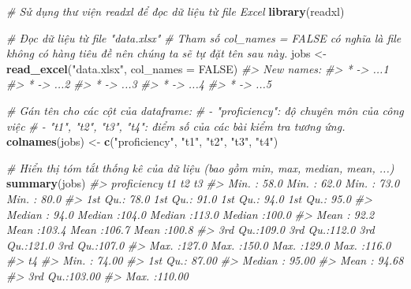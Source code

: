 \documentclass[
]{article}
\newenvironment{Shaded}{\begin{snugshade}}{\end{snugshade}}
\newcommand{\AttributeTok}[1]{\textcolor[rgb]{0.13,0.29,0.53}{#1}}
\newcommand{\CommentTok}[1]{\textcolor[rgb]{0.56,0.35,0.01}{\textit{#1}}}
\newcommand{\ConstantTok}[1]{\textcolor[rgb]{0.56,0.35,0.01}{#1}}
\newcommand{\FunctionTok}[1]{\textcolor[rgb]{0.13,0.29,0.53}{\textbf{#1}}}
\newcommand{\NormalTok}[1]{#1}
\newcommand{\OtherTok}[1]{\textcolor[rgb]{0.56,0.35,0.01}{#1}}
\newcommand{\StringTok}[1]{\textcolor[rgb]{0.31,0.60,0.02}{#1}}
\begin{document}
\begin{Shaded}
\begin{Highlighting}[]
\CommentTok{\# Sử dụng thư viện readxl để đọc dữ liệu từ file Excel}
\FunctionTok{library}\NormalTok{(readxl)}

\CommentTok{\# Đọc dữ liệu từ file "data.xlsx" }
\CommentTok{\# Tham số col\_names = FALSE có nghĩa là file không có hàng tiêu đề nên chúng ta sẽ tự đặt tên sau này.}
\NormalTok{jobs }\OtherTok{\textless{}{-}} \FunctionTok{read\_excel}\NormalTok{(}\StringTok{"data.xlsx"}\NormalTok{, }\AttributeTok{col\_names =} \ConstantTok{FALSE}\NormalTok{)}
\CommentTok{\#\textgreater{} New names:}
\CommentTok{\#\textgreater{} * \textasciigrave{}\textasciigrave{} {-}\textgreater{} \textasciigrave{}...1\textasciigrave{}}
\CommentTok{\#\textgreater{} * \textasciigrave{}\textasciigrave{} {-}\textgreater{} \textasciigrave{}...2\textasciigrave{}}
\CommentTok{\#\textgreater{} * \textasciigrave{}\textasciigrave{} {-}\textgreater{} \textasciigrave{}...3\textasciigrave{}}
\CommentTok{\#\textgreater{} * \textasciigrave{}\textasciigrave{} {-}\textgreater{} \textasciigrave{}...4\textasciigrave{}}
\CommentTok{\#\textgreater{} * \textasciigrave{}\textasciigrave{} {-}\textgreater{} \textasciigrave{}...5\textasciigrave{}}

\CommentTok{\# Gán tên cho các cột của dataframe:}
\CommentTok{\# {-} "proficiency": độ chuyên môn của công việc}
\CommentTok{\# {-} "t1", "t2", "t3", "t4": điểm số của các bài kiểm tra tương ứng.}
\FunctionTok{colnames}\NormalTok{(jobs) }\OtherTok{\textless{}{-}} \FunctionTok{c}\NormalTok{(}\StringTok{"proficiency"}\NormalTok{, }\StringTok{"t1"}\NormalTok{, }\StringTok{"t2"}\NormalTok{, }\StringTok{"t3"}\NormalTok{, }\StringTok{"t4"}\NormalTok{)}

\CommentTok{\# Hiển thị tóm tắt thống kê của dữ liệu (bao gồm min, max, median, mean, ...)}
\FunctionTok{summary}\NormalTok{(jobs)}
\CommentTok{\#\textgreater{}   proficiency          t1              t2              t3       }
\CommentTok{\#\textgreater{}  Min.   : 58.0   Min.   : 62.0   Min.   : 73.0   Min.   : 80.0  }
\CommentTok{\#\textgreater{}  1st Qu.: 78.0   1st Qu.: 91.0   1st Qu.: 94.0   1st Qu.: 95.0  }
\CommentTok{\#\textgreater{}  Median : 94.0   Median :104.0   Median :113.0   Median :100.0  }
\CommentTok{\#\textgreater{}  Mean   : 92.2   Mean   :103.4   Mean   :106.7   Mean   :100.8  }
\CommentTok{\#\textgreater{}  3rd Qu.:109.0   3rd Qu.:112.0   3rd Qu.:121.0   3rd Qu.:107.0  }
\CommentTok{\#\textgreater{}  Max.   :127.0   Max.   :150.0   Max.   :129.0   Max.   :116.0  }
\CommentTok{\#\textgreater{}        t4        }
\CommentTok{\#\textgreater{}  Min.   : 74.00  }
\CommentTok{\#\textgreater{}  1st Qu.: 87.00  }
\CommentTok{\#\textgreater{}  Median : 95.00  }
\CommentTok{\#\textgreater{}  Mean   : 94.68  }
\CommentTok{\#\textgreater{}  3rd Qu.:103.00  }
\CommentTok{\#\textgreater{}  Max.   :110.00}
\end{Highlighting}
\end{Shaded}
\end{document}

